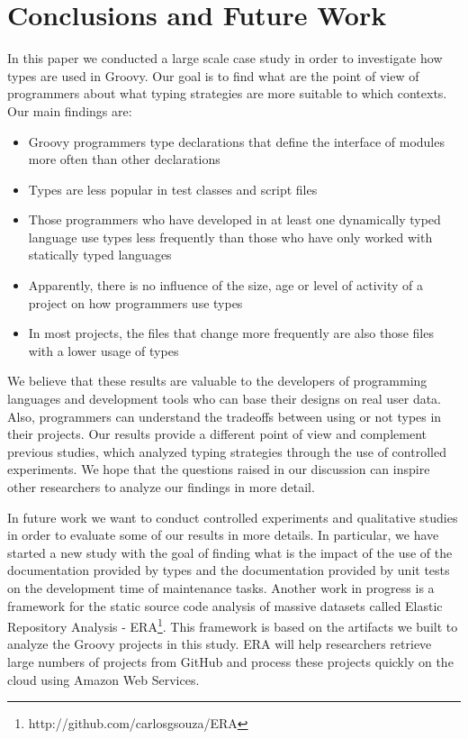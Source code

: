 \documentclass[msc]{ppgccufmg}
\begin{document}
\chapter{Conclusions and Future Work\label{conclusion}}
In this paper we conducted a large scale case study in order to investigate how types are used in Groovy.
Our goal is to find what are the point of view of programmers about what typing strategies are more suitable to which contexts.
Our main findings are:
\begin{itemize}
	\item Groovy programmers type declarations that define the interface of modules more often than other declarations
	\item Types are less popular in test classes and script files
	\item Those programmers who have developed in at least one dynamically typed language use types less frequently than those who have only worked with statically typed languages
	\item Apparently, there is no influence of the size, age or level of activity of a project on how programmers use types
	\item In most projects, the files that change more frequently are also those files with a lower usage of types
\end{itemize}

We believe that these results are valuable to the developers of programming languages and development tools who can base their designs on real user data.
Also, programmers can understand the tradeoffs between using or not types in their projects.
Our results provide a different point of view and complement previous studies, which analyzed typing strategies through the use of controlled experiments. 
We hope that the questions raised in our discussion can inspire other researchers to analyze our findings in more detail.

In future work we want to conduct controlled experiments and qualitative studies in order to evaluate some of our results in more details.
In particular, we have started a new study with the goal of finding what is the impact of the use of the documentation provided by types and the documentation provided by unit tests on the development time of maintenance tasks.
Another work in progress is a framework for the static source code analysis of massive datasets called Elastic Repository Analysis - ERA\footnote{http://github.com/carlosgsouza/ERA}.
This framework is based on the artifacts we built to analyze the Groovy projects in this study.
ERA will help researchers retrieve large numbers of projects from GitHub and process these projects quickly on the cloud using Amazon Web Services.
\end{document}
